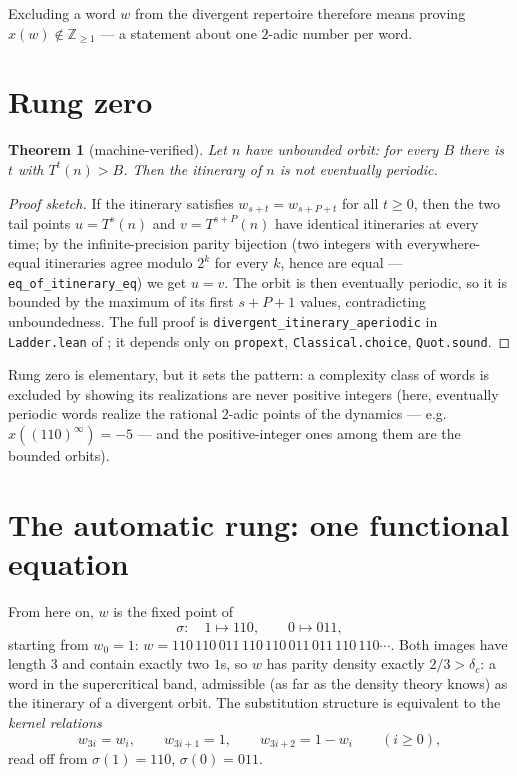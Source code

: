 \documentclass[11pt]{article}
\newtheorem{theorem}{Theorem}[section]
\theoremstyle{definition}
\newcommand{\Z}{\mathbb{Z}}
\newcommand{\code}[1]{\texttt{#1}}
\begin{document}
Excluding a word $w$ from the divergent repertoire therefore means
proving $x(w) \notin \Z_{\ge 1}$ --- a statement about one $2$-adic
number per word.

\section{Rung zero}\label{sec:rungzero}

\begin{theorem}[machine-verified]\label{thm:rungzero}
Let $n$ have unbounded orbit: for every $B$ there is $t$ with
$T^{t}(n) > B$. Then the itinerary of $n$ is not eventually periodic.
\end{theorem}

\begin{proof}[Proof sketch]
If the itinerary satisfies $w_{s+t} = w_{s+P+t}$ for all $t \ge 0$,
then the two tail points $u = T^{s}(n)$ and $v = T^{s+P}(n)$ have
identical itineraries at every time; by the infinite-precision parity
bijection (two integers with everywhere-equal itineraries agree modulo
$2^k$ for every $k$, hence are equal --- \code{eq\_of\_itinerary\_eq})
we get $u = v$. The orbit is then eventually periodic, so it is
bounded by the maximum of its first $s + P + 1$ values, contradicting
unboundedness. The full proof is
\code{divergent\_itinerary\_aperiodic} in \code{Ladder.lean} of
\cite{companion}; it depends only on \code{propext},
\code{Classical.choice}, \code{Quot.sound}.
\end{proof}

Rung zero is elementary, but it sets the pattern: a complexity class
of words is excluded by showing its realizations are never positive
integers (here, eventually periodic words realize the rational
$2$-adic points of the dynamics --- e.g.\ $x((110)^\infty) = -5$ ---
and the positive-integer ones among them are the bounded orbits).

\section{The automatic rung: one functional equation}
\label{sec:mahler}

From here on, $w$ is the fixed point of
\[
\sigma:\quad 1 \mapsto 110, \qquad 0 \mapsto 011,
\]
starting from $w_0 = 1$:
$w = 110\,110\,011\,110\,110\,011\,011\,110\,110\cdots$. Both images
have length $3$ and contain exactly two $1$s, so $w$ has parity
density exactly $2/3 > \delta_c$: a word in the supercritical band,
admissible (as far as the density theory knows) as the itinerary of a
divergent orbit. The substitution structure is equivalent to the
\emph{kernel relations}
\begin{equation}\label{eq:kernel}
w_{3i} = w_i, \qquad w_{3i+1} = 1, \qquad w_{3i+2} = 1 - w_i
\qquad (i \ge 0),
\end{equation}
read off from $\sigma(1) = 110$, $\sigma(0) = 011$.
\end{document}
